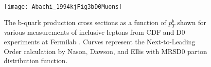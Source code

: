    \begin{figure}[h]
  \centering
  \texttt{[image: Abachi\_1994kjFig3bD0Muons]}\\
  \caption{The b-quark production cross sections as a function of $p_{T}^{b}$ shown for various measurements of inclusive leptons from CDF and D0 experiments at Fermilab \cite{Abachi:1994kj}. Curves represent the Next-to-Leading Order calculation by Nason, Dawson, and Ellis with MRSD0 parton distribution function.} \label{fig:Abachi_1994kjFig3bD0Muons}
\end{figure}


%




